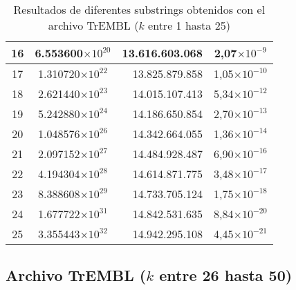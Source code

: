 \begin{table}[!hbt]
\begin{tabular}{| c  r  r  c |}
   16 & \multicolumn{1}{c}{6.553600$\times 10^{20}$} & 13.616.603.068 & 2,07$\times 10^{-9}$\\ \hline
   17 & \multicolumn{1}{c}{1.310720$\times 10^{22}$} & 13.825.879.858 & 1,05$\times 10^{-10}$\\ \hline
   18 & \multicolumn{1}{c}{2.621440$\times 10^{23}$} & 14.015.107.413 & 5,34$\times 10^{-12}$\\ \hline
   19 & \multicolumn{1}{c}{5.242880$\times 10^{24}$} & 14.186.650.854 & 2,70$\times 10^{-13}$\\ \hline
   20 & \multicolumn{1}{c}{1.048576$\times 10^{26}$} & 14.342.664.055 & 1,36$\times 10^{-14}$\\ \hline
   21 & \multicolumn{1}{c}{2.097152$\times 10^{27}$} & 14.484.928.487 & 6,90$\times 10^{-16}$\\ \hline
   22 & \multicolumn{1}{c}{4.194304$\times 10^{28}$} & 14.614.871.775 & 3,48$\times 10^{-17}$\\ \hline
   23 & \multicolumn{1}{c}{8.388608$\times 10^{29}$} & 14.733.705.124 & 1,75$\times 10^{-18}$\\ \hline
   24 & \multicolumn{1}{c}{1.677722$\times 10^{31}$} & 14.842.531.635 & 8,84$\times 10^{-20}$\\ \hline
   25 & \multicolumn{1}{c}{3.355443$\times 10^{32}$} & 14.942.295.108 & 4,45$\times 10^{-21}$\\ \hline
   \end{tabular}
   \caption{Resultados de diferentes substrings obtenidos con el archivo TrEMBL ($k$ entre 1 hasta 25)}
   \label{tb:labela21}
\end{table}

\newpage

\subsection*{Archivo TrEMBL ($k$ entre 26 hasta 50)}

